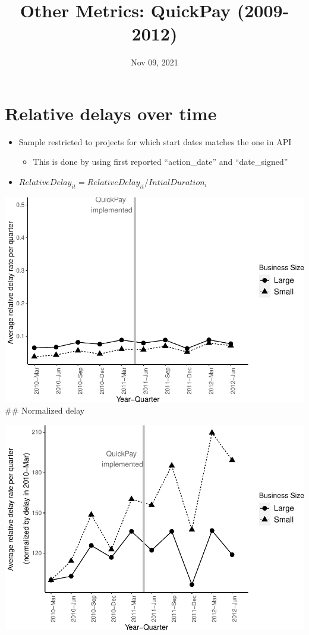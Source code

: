 \documentclass[
]{article}
\title{Other Metrics: QuickPay (2009-2012)}
\author{}
\date{\vspace{-2.5em}Nov 09, 2021}
\providecommand{\tightlist}{%
  \setlength{\itemsep}{0pt}\setlength{\parskip}{0pt}}
\begin{document}
\maketitle

\hypertarget{relative-delays-over-time}{%
\section{Relative delays over time}\label{relative-delays-over-time}}

\begin{itemize}
\tightlist
\item
  Sample restricted to projects for which start dates matches the one in
  API

  \begin{itemize}
  \tightlist
  \item
    This is done by using first reported ``action\_date'' and
    ``date\_signed''
  \end{itemize}
\item
  \(RelativeDelay_{it} = RelativeDelay_{it}/IntialDuration_i\)
\end{itemize}

\includegraphics{qp_first_relative_delay_files/figure-latex/plot_relative_delay-1.pdf}
\#\# Normalized delay

\includegraphics{qp_first_relative_delay_files/figure-latex/normalized_plot-1.pdf}
\end{document}
